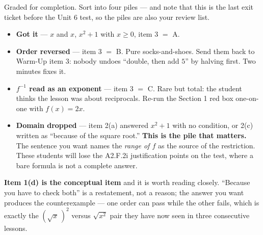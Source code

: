 \documentclass[10pt]{article}
\begin{document}
\begin{teachernote}
\small Graded for completion. Sort into four piles --- and note that this is the last exit ticket
before the Unit 6 test, so the piles are also your review list.
\begin{itemize}[leftmargin=1.3em, nosep]
  \item \textbf{Got it} --- $x$ and $x$, $x^{2}+1$ with $x\ge0$, item 3 $=$ A.
  \item \textbf{Order reversed} --- item 3 $=$ B. Pure socks-and-shoes. Send them back to Warm-Up
        item 3: nobody undoes ``double, then add $5$'' by halving first. Two minutes fixes it.
  \item \textbf{$f^{-1}$ read as an exponent} --- item 3 $=$ C. Rare but total: the student thinks
        the lesson was about reciprocals. Re-run the Section 1 red box one-on-one with $f(x)=2x$.
  \item \textbf{Domain dropped} --- item 2(a) answered $x^{2}+1$ with no condition, or 2(c) written
        as ``because of the square root.'' \textbf{This is the pile that matters.} The sentence you
        want names the \emph{range of $f$} as the source of the restriction. These students will
        lose the A2.F.2i justification points on the test, where a bare formula is not a complete
        answer.
\end{itemize}
\textbf{Item 1(d) is the conceptual item} and it is worth reading closely. ``Because you have to
check both'' is a restatement, not a reason; the answer you want produces the counterexample --- one
order can pass while the other fails, which is exactly the $\left(\sqrt{x}\,\right)^{2}$ versus
$\sqrt{x^{2}}$ pair they have now seen in three consecutive lessons.
\end{teachernote}
\end{document}
